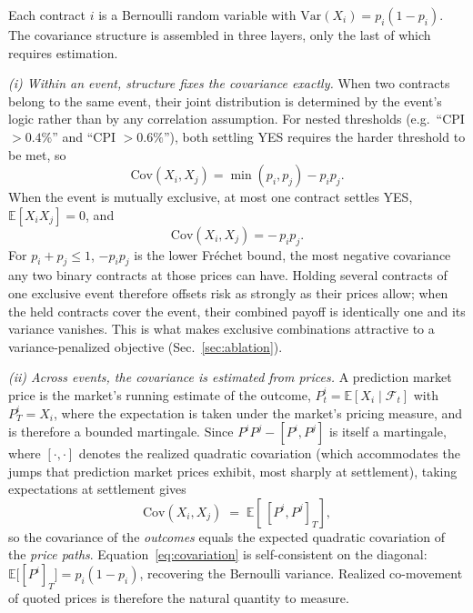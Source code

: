 \documentclass[aps, reprint, prl, twocolumn, superscriptaddress,amsmath,amssymb,noeprint]{revtex4-2}
\begin{document}
Each contract $i$ is a Bernoulli random variable with
$\text{Var}(X_i) = p_i(1-p_i)$.  The covariance structure is assembled in
three layers, only the last of which requires estimation.

\textit{(i) Within an event, structure fixes the covariance exactly.}  When
two contracts belong to the same event, their joint distribution is
determined by the event's logic rather than by any correlation
assumption.  For nested thresholds (e.g.\ ``CPI $>0.4\%$'' and ``CPI
$>0.6\%$''), both settling YES requires the harder threshold to be met,
so
\begin{equation}
  \text{Cov}(X_i, X_j) = \min(p_i, p_j) - p_i p_j .
  \label{eq:nested_cov}
\end{equation}
When the event is mutually exclusive, at most one contract settles YES,
$\mathbb{E}[X_iX_j]=0$, and
\begin{equation}
  \text{Cov}(X_i, X_j) = -\,p_i p_j .
  \label{eq:disjoint_cov}
\end{equation}
For $p_i + p_j \le 1$, $-p_ip_j$ is the lower Fr\'{e}chet bound, the most
negative covariance any two binary contracts at those prices can have.
Holding several contracts of one exclusive event therefore offsets risk as
strongly as their prices allow; when the held contracts cover the event, their
combined payoff is identically one and its variance vanishes.  This is what
makes exclusive combinations attractive to a variance-penalized objective
(Sec.~\ref{sec:ablation}).

\textit{(ii) Across events, the covariance is estimated from prices.}  A
prediction market price is the market's running estimate of the outcome,
$P^i_t = \mathbb{E}[X_i \mid \mathcal{F}_t]$ with $P^i_T = X_i$, where the
expectation is taken under the market's pricing measure, and is
therefore a bounded martingale.  Since $P^iP^j - [P^i,P^j]$ is itself a
martingale, where $[\cdot,\cdot]$ denotes the realized quadratic
covariation (which accommodates the jumps that prediction market prices
exhibit, most sharply at settlement), taking expectations at settlement
gives
\begin{equation}
  \text{Cov}(X_i, X_j) \;=\; \mathbb{E}\!\left[\,[P^i, P^j]_T\right],
  \label{eq:covariation}
\end{equation}
so the covariance of the \emph{outcomes} equals the expected quadratic
covariation of the \emph{price paths}.  Equation~\eqref{eq:covariation}
is self-consistent on the diagonal: $\mathbb{E}\big[[P^i]_T\big] =
p_i(1-p_i)$, recovering the Bernoulli variance.  Realized co-movement of
quoted prices is therefore the natural quantity to measure.
\end{document}
